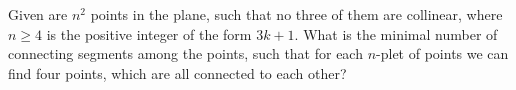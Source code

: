 Given are $n^2$ points in the plane, such that no three of them are collinear, where $n \geq 4$ is the positive integer of the form $3k+1$. What is the minimal number of connecting segments among the points, such that for each $n$-plet of points we can find four points, which are all connected to each other?

